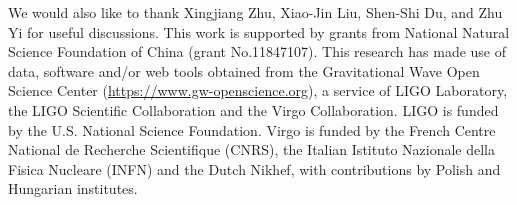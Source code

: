 \documentclass[
reprint,           %
superscriptaddress,%
amsmath,           %
amssymb,           %
aps,               %
prd,               %
notitlepage,       %
longbibliography,  %
floatfix,          %
showkeys,          %
]{revtex4-1}
\begin{document}
\begin{acknowledgments}
We would also like to thank Xingjiang Zhu, Xiao-Jin Liu, Shen-Shi Du, and Zhu Yi for useful discussions.
This work is supported by grants from National Natural Science Foundation of China (grant No.11847107). 
This research has made use of data, software and/or web tools obtained 
from the Gravitational Wave Open Science Center \cite{Vallisneri:2014vxa}
(\url{https://www.gw-openscience.org}), a service of LIGO Laboratory, 
the LIGO Scientific Collaboration and the Virgo Collaboration. 
LIGO is funded by the U.S. National Science Foundation. 
Virgo is funded by the French Centre National de Recherche Scientifique (CNRS),
the Italian Istituto Nazionale della Fisica Nucleare (INFN) and the Dutch Nikhef,
with contributions by Polish and Hungarian institutes. 
\end{acknowledgments}	
	

\end{document}
